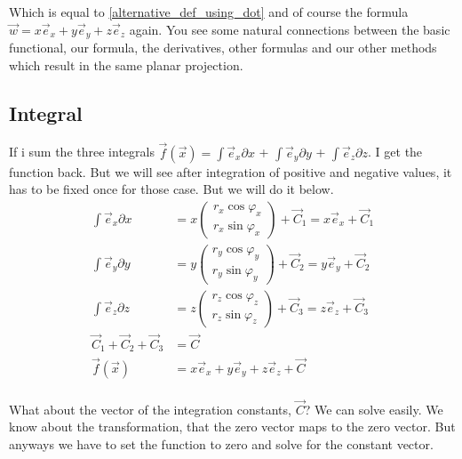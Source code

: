 \documentclass[a4paper]{article}
\begin{document}
\begin{Example}
Which is equal to \ref{alternative_def_using_dot} and of course the formula $\vec{w} = x\vec{e}_{x}+y\vec{e}_{y}+z\vec{e}_{z}$ again. You see some natural connections between the basic functional, our formula, the derivatives, other formulas and our other methods which result in the same planar projection.\\

\subsection{Integral}

If i sum the three integrals $\vec{f}(\vec{x}) = \int\vec{e}_{x}\partial{x}$ + $\int\vec{e}_{y}\partial{y}$ + $\int\vec{e}_{z}\partial{z}$. I get the function back. But we will see after integration of positive and negative values, it has to be fixed once for those case. But we will do it below.\\

\begin{displaymath}
\begin{align}
\int\vec{e}_{x}\partial{x} &= x\begin{pmatrix}r_x\cos\varphi_x\\r_x\sin\varphi_x\end{pmatrix} + \vec{C}_{1} = x\vec{e}_{x} + \vec{C}_{1}\\
\int\vec{e}_{y}\partial{y} &= y\begin{pmatrix}r_y\cos\varphi_y\\r_y\sin\varphi_y\end{pmatrix} + \vec{C}_{2} = y\vec{e}_{y} + \vec{C}_{2}\\
\int\vec{e}_{z}\partial{z} &= z\begin{pmatrix}r_z\cos\varphi_z\\r_z\sin\varphi_z\end{pmatrix} + \vec{C}_{3} = z\vec{e}_{z} + \vec{C}_{3}\\
\vec{C}_{1} + \vec{C}_{2} + \vec{C}_{3} &= \vec{C}\\
\vec{f}(\vec{x}) &= x\vec{e}_{x} +y\vec{e}_{y} +z\vec{e}_{z} + \vec{C}\\
\end{align}
\end{displaymath}

What about the vector of the integration constants, $\vec{C}$? We can solve easily. We know about the transformation, that the zero vector maps to the zero vector. But anyways we have to set the function to zero and solve for the constant vector.\\


\end{Example}
\end{document}
